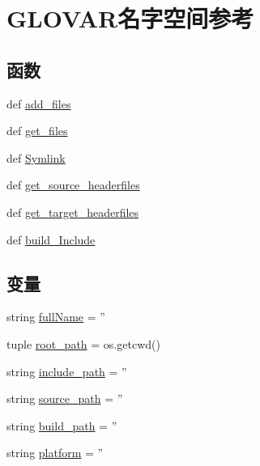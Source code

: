 \hypertarget{namespaceGLOVAR}{
\section{GLOVAR名字空间参考}
\label{namespaceGLOVAR}
}
\subsection*{函数}
\begin{DoxyCompactItemize}
\item 
def \hyperlink{namespaceGLOVAR_a066270fc23e62e60bd2ddc2850cd047a}{add\_\-files}
\item 
def \hyperlink{namespaceGLOVAR_ac0851f09b0d8bd8b4ff01d6c9ac7a9df}{get\_\-files}
\item 
def \hyperlink{namespaceGLOVAR_a118820a1780cc34db70f36efa199aa6c}{Symlink}
\item 
def \hyperlink{namespaceGLOVAR_a98ab3f054bd426b67fb92bb8943d8d59}{get\_\-source\_\-headerfiles}
\item 
def \hyperlink{namespaceGLOVAR_ac120cd73f9bb2ff537b62451a4c0dba1}{get\_\-target\_\-headerfiles}
\item 
def \hyperlink{namespaceGLOVAR_a7157866db6f95a7853123b722b81a31c}{build\_\-Include}
\end{DoxyCompactItemize}
\subsection*{变量}
\begin{DoxyCompactItemize}
\item 
string \hyperlink{namespaceGLOVAR_adacd367e71b398b7b6d55f6e70a17966}{fullName} = ''
\item 
tuple \hyperlink{namespaceGLOVAR_a1a7b1b5b174c317ca37ea94bcc181a0a}{root\_\-path} = os.getcwd()
\item 
string \hyperlink{namespaceGLOVAR_ad331badb77a9658b750ad273e3b23dbd}{include\_\-path} = ''
\item 
string \hyperlink{namespaceGLOVAR_ac99de7c6168cd6caa159f8ba26491c1a}{source\_\-path} = ''
\item 
string \hyperlink{namespaceGLOVAR_ab2709a5331917c6323f60b51f06d3bb0}{build\_\-path} = ''
\item 
string \hyperlink{namespaceGLOVAR_ab502d063b10b046dd09e34362f9d052c}{platform} = ''
\end{DoxyCompactItemize}


